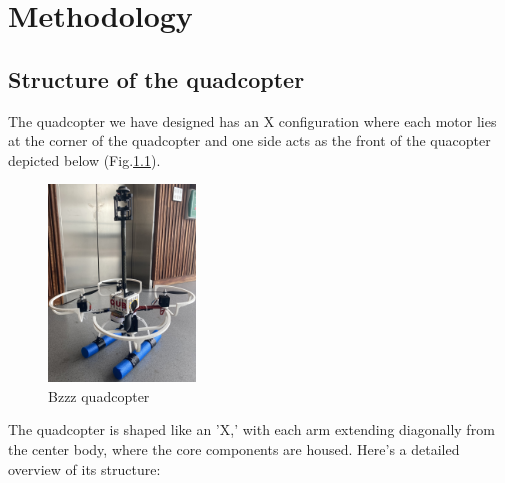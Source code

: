 \documentclass{report}
\begin{document}
\chapter{Methodology}
\section{Structure of the quadcopter}
The quadcopter we have designed has an X configuration where each motor lies at
the corner of the quadcopter and one side acts as the front of the quacopter
depicted below (Fig.\ref{fig:QuadDiagram}). 

\begin{figure}[h] %
  \centering
  \includegraphics[width=0.35\textwidth]{Pictures/Quad.jpg} 
  \caption{Bzzz quadcopter}
  \label{fig:QuadDiagram}
\end{figure}

\noindent
The quadcopter is shaped like an 'X,' with each arm extending diagonally from the
center body, where the core components are housed. Here's a detailed overview of
its structure:
\end{document}
